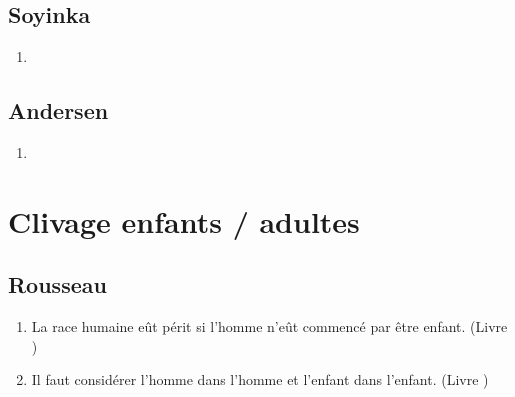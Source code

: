 \documentclass[a4paper, 11pt, hidelinks]{article}
\newcommand{\rb}[1]{\Romanbar{#1}}
\begin{document}
\subsection{Soyinka}


\begin{enumerate}
    \item 
\end{enumerate}




\subsection{Andersen}


\begin{enumerate}
    \item 
\end{enumerate}












































\section{Clivage enfants / adultes}



\subsection{Rousseau}


\begin{enumerate}
    \item La race humaine eût périt si l'homme n'eût commencé par être enfant. (Livre \rb{1})
    \item Il faut considérer l'homme dans l'homme et l'enfant dans l'enfant. (Livre \rb{2})
\end{enumerate}
\end{document}

